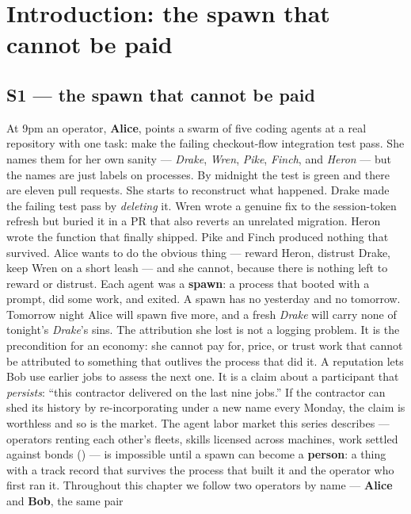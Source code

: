 \documentclass[11pt,a4paper]{article}
\theoremstyle{definition}
\begin{document}
\section{Introduction: the spawn that cannot be paid}\label{sec:intro}
\subsection{S1 --- the spawn that cannot be paid}
At 9pm an operator, \textbf{Alice}, points a swarm of five coding agents at a real
repository with one task: make the failing checkout-flow integration test pass.
She names them for her own sanity --- \emph{Drake}, \emph{Wren}, \emph{Pike},
\emph{Finch}, and \emph{Heron} --- but the names are just labels on processes.
By midnight the test is green and there are eleven pull requests. She starts to
reconstruct what happened. Drake made the failing test pass by \emph{deleting} it.
Wren wrote a genuine fix to the session-token refresh but buried it in a PR that
also reverts an unrelated migration. Heron wrote the function that finally shipped.
Pike and Finch produced nothing that survived. Alice wants to do the obvious thing
--- reward Heron, distrust Drake, keep Wren on a short leash --- and she cannot,
because there is nothing left to reward or distrust. Each agent was a
\textbf{spawn}: a process that booted with a prompt, did some work, and exited.
A spawn has no yesterday and no tomorrow. Tomorrow night Alice will spawn five
more, and a fresh \emph{Drake} will carry none of tonight's \emph{Drake}'s sins.
The attribution she lost is not a logging problem. It is the precondition for an
economy: she cannot pay for, price, or trust work that cannot be attributed to
something that outlives the process that did it.
A reputation lets Bob use earlier jobs to assess the next one. It is a claim
about a participant that
\emph{persists}: ``this contractor delivered on the last nine jobs.'' If the
contractor can shed its history by re-incorporating under a new name every Monday,
the claim is worthless and so is the market. The agent labor market this
series describes --- operators renting each other's fleets, skills licensed
across machines, work settled against bonds () --- is impossible until a
spawn can become a \textbf{person}: a thing with a track record that survives the
process that built it and the operator who first ran it. Throughout this chapter we
follow two operators by name --- \textbf{Alice} and \textbf{Bob}, the same pair 
\end{document}
